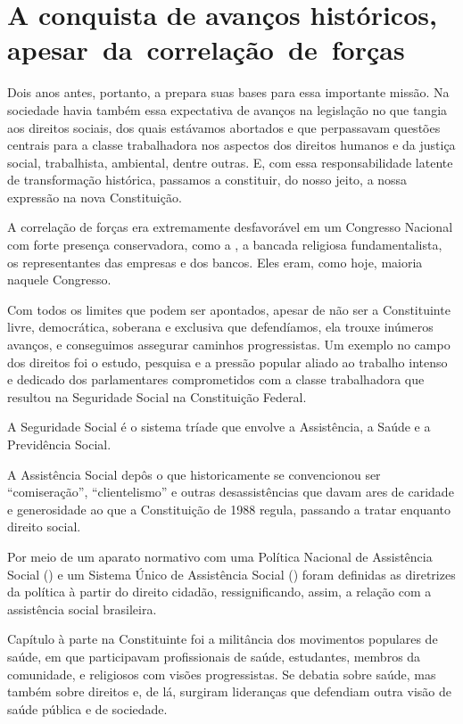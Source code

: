 \section{A conquista de avanços históricos, apesar~da~correlação~de~forças}

Dois anos antes, portanto, a  prepara suas bases para essa
importante missão. Na sociedade havia também essa expectativa de avanços
na legislação no que tangia aos direitos sociais, dos quais estávamos
abortados e que perpassavam questões centrais para a classe trabalhadora
nos aspectos dos direitos humanos e da justiça social, trabalhista,
ambiental, dentre outras. E, com essa responsabilidade latente de
transformação histórica, passamos a constituir, do nosso jeito, a nossa
expressão na nova Constituição.

A correlação de forças era extremamente desfavorável em um Congresso
Nacional com forte presença conservadora, como a , a bancada
religiosa fundamentalista, os representantes das empresas e dos bancos.
Eles eram, como hoje, maioria naquele Congresso.

Com todos os limites que podem ser apontados, apesar de não ser a
Constituinte livre, democrática, soberana e exclusiva que defendíamos,
ela trouxe inúmeros avanços, e conseguimos assegurar caminhos
progressistas. Um exemplo no campo dos direitos foi o
estudo, pesquisa e a pressão popular aliado ao trabalho intenso e
dedicado dos parlamentares comprometidos com a classe trabalhadora que
resultou na Seguridade Social na Constituição Federal.

A Seguridade Social é o sistema tríade que envolve a Assistência, a
Saúde e a Previdência Social.

A Assistência Social depôs o que historicamente se convencionou ser
``comiseração'', ``clientelismo'' e outras desassistências que davam
ares de caridade e generosidade ao que a Constituição de 1988 regula,
passando a tratar enquanto direito social.

Por meio de um aparato normativo com uma Política Nacional de
Assistência Social () e um Sistema Único de Assistência Social
() foram definidas as diretrizes da política à partir do direito
cidadão, ressignificando, assim, a relação com a assistência social
brasileira.

Capítulo à parte na Constituinte foi a militância dos movimentos
populares de saúde, em que participavam profissionais de saúde,
estudantes, membros da comunidade, e religiosos com visões progressistas.
Se debatia sobre saúde, mas também sobre direitos e, de lá, surgiram
lideranças que defendiam outra visão de saúde pública e de sociedade.

